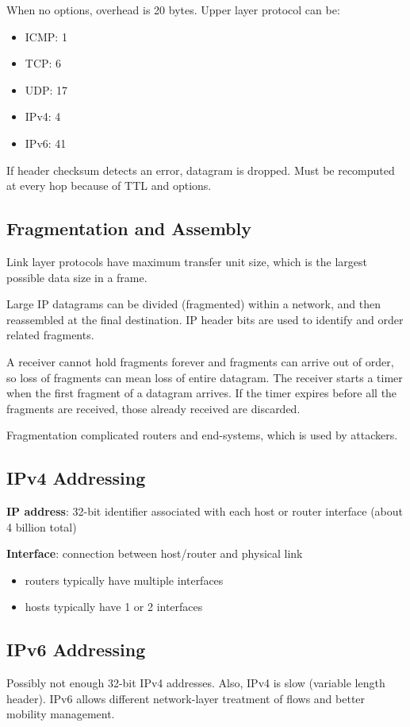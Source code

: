 \documentclass[11pt]{article}
\begin{document}
When no options, overhead is 20 bytes.
Upper layer protocol can be:
\begin{itemize}
\item ICMP: 1
\item TCP: 6
\item UDP: 17
\item IPv4: 4
\item IPv6: 41
\end{itemize}

If header checksum detects an error, datagram is dropped.
Must be recomputed at every hop because of TTL and options.
\subsection{Fragmentation and Assembly}
\label{sec:orgb5bc666}
Link layer protocols have maximum transfer unit size, which is the largest
possible data size in a frame.

Large IP datagrams can be divided (fragmented) within a network, and then
reassembled at the final destination.
IP header bits are used to identify and order related fragments.

A receiver cannot hold fragments forever and fragments can arrive out of order,
so loss of fragments can mean loss of entire datagram.
The receiver starts a timer when the first fragment of a datagram arrives.
If the timer expires before all the fragments are received, those already
received are discarded.

Fragmentation complicated routers and end-systems, which is used by attackers.
\subsection{IPv4 Addressing}
\label{sec:org4612f06}
\textbf{IP address}: 32-bit identifier associated with each host or router interface
(about 4 billion total)

\textbf{Interface}: connection between host/router and physical link
\begin{itemize}
\item routers typically have multiple interfaces
\item hosts typically have 1 or 2 interfaces
\end{itemize}
\subsection{IPv6 Addressing}
\label{sec:org1fd18f7}
Possibly not enough 32-bit IPv4 addresses. Also, IPv4 is slow (variable length header).
IPv6 allows different network-layer treatment of flows and better mobility management.
\end{document}
